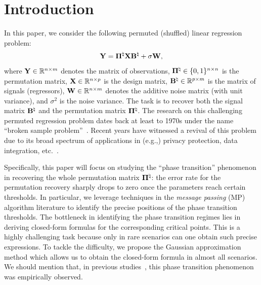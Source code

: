 \documentclass[11pt]{article}
\begin{document}
\newpage

\section{Introduction}

In this paper, we consider the following permuted (shuffled) linear regression problem:
\begin{align}\label{eqn:problem}
\mathbf{Y} = \boldsymbol{\Pi}^{\natural}\mathbf{X}\mathbf{B}^{\natural} + \sigma \mathbf{W},
\end{align}
where $\mathbf{Y}\in \mathbb{R}^{n\times m}$ denotes the matrix of observations,
$\boldsymbol{\Pi}^{\natural}\in \{0, 1\}^{n\times n}$ is the permutation
matrix, $\mathbf{X}\in \mathbb{R}^{n\times p}$ is the design matrix,
$\mathbf{B}^{\natural}\in \mathbb{R}^{p\times m}$ is the matrix of signals (regressors), $\mathbf{W} \in \mathbb{R}^{n\times m}$ denotes the
additive noise matrix (with unit variance), and $\sigma^2$ is the noise variance. The task is to recover both the signal matrix $\mathbf{B}^{\natural}$ and the permutation matrix $\boldsymbol{\Pi}^{\natural}$. The research on this challenging permuted regression problem dates back
at least to 1970s under the name ``broken sample problem''~\citep{degroot1971matchmaking, goel1975re, degroot1976matching, degroot1980estimation,bai2005broken}.
Recent years have witnessed a revival of this problem
due to its broad spectrum of applications in (e.g.,) privacy protection,
data integration, etc.~\citep{unnikrishnan2015unlabeled, pananjady2016linear, slawski2017linear, pananjady2017denoising, slawski2019two, zhang2020optimal}.

\vspace{0.1in}

Specifically, this paper will focus on studying the ``phase transition'' phenomenon in recovering the whole permutation matrix $\boldsymbol{\Pi}^{\natural}$: the error rate for the permutation recovery sharply drops to zero once the parameters reach certain thresholds. In particular, we leverage techniques in the \emph{message passing} (MP) algorithm literature to identify the precise positions of the phase transition thresholds.
The bottleneck in identifying the phase transition regimes lies in deriving closed-form formulas for the corresponding critical points. This is a highly challenging task because  only in rare scenarios can one obtain such precise expressions. To tackle the difficulty, we propose the Gaussian approximation method which allows us to obtain the closed-form formula in almost all scenarios. We should mention that, in previous studies~\citep{slawski2019two, slawski2017linear, pananjady2017denoising, zhang2022benefits, zhang2020optimal}, this phase transition phenomenon was empirically observed.
\end{document}
